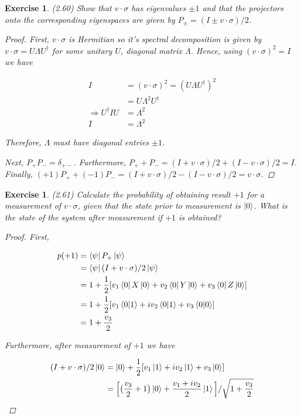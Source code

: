 \documentclass[11pt]{article}
\newcommand\0{\mathbf{0}}
\newcommand\<{\langle}
\renewcommand\>{\rangle}
\renewcommand\implies{\Rightarrow}
\newtheorem{exercise}[theorem]{Exercise}
\begin{document}
\begin{exercise}
	(2.60) Show that $v \cdot \sigma$ has eigenvalues $\pm 1$ and that the projectors onto the corresponding eigenspaces are given by $P_{\pm} = (I \pm v \cdot \sigma)/2$.

\begin{proof}
	First, $v\cdot \sigma$ is Hermitian so it's spectral decomposition is given by $v \cdot \sigma = U \Lambda U^\dag$ for some unitary $U$, diagonal matrix $\Lambda$. Hence, using $(v\cdot \sigma)^2 = I$ we have
	
	\begin{align*}
		I &= (v \cdot \sigma)^2 = (U \Lambda U^\dag)^2 \\
		&= U \Lambda^2 U^\dag \\
		\implies U^\dag I U &= \Lambda^2 \\
		I & = \Lambda^2
	\end{align*}

Therefore, $\Lambda$ must have diagonal entries $\pm 1$. 

Next, $P_+ P_- = \delta_{+-}$. Furthermore, $P_+ + P_- = (I + v \cdot \sigma)/2 + (I - v \cdot \sigma)/2 = I$. Finally, $(+1)P_+ + (-1)P_- = (I + v \cdot \sigma)/2 - (I - v \cdot \sigma)/2 = v \cdot \sigma$. 
\end{proof}
\end{exercise}

\begin{exercise}
	(2.61) Calculate the probability of obtaining result $+1$ for a measurement of $v \cdot \sigma$, given that the state prior to measurement is $\ket{0}$. What is the state of the system after measurement if $+1$ is obtained?
	
	\begin{proof}
	
	First, 
	
		\begin{align*}
			p(+1) &= \bra{\psi} P_+ \ket{\psi} \\
			&= \bra{\psi}(I + v \cdot \sigma)/2\ket{\psi} \\
			&= 1 + \frac{1}{2}[ v_1\bra{0} X \ket{0} + v_2\bra{0} Y \ket{0} + v_3\bra{0} Z \ket{0}] \\
			&= 1 + \frac{1}{2}[ v_1\bra{0}\ket{1} + iv_2\bra{0}\ket{1} + v_3\bra{0}\ket{0}] \\
			&= 1+ \frac{v_3}{2}
		\end{align*}
	
	Furthermore, after measurement of $+1$ we have
	
	\begin{align*}
		(I + v \cdot \sigma)/2\ket{0} &= \ket{0} + \frac{1}{2}[ v_1\ket{1} + iv_2\ket{1} + v_3\ket{0}] \\
		&= \Big[\big(\frac{v_3}{2} + 1\big)\ket{0} + \frac{v_1 + iv_2}{2}\ket{1}\Big]/\sqrt{1+ \frac{v_3}{2}}
	\end{align*}

	\end{proof}
\end{exercise}
\end{document}
